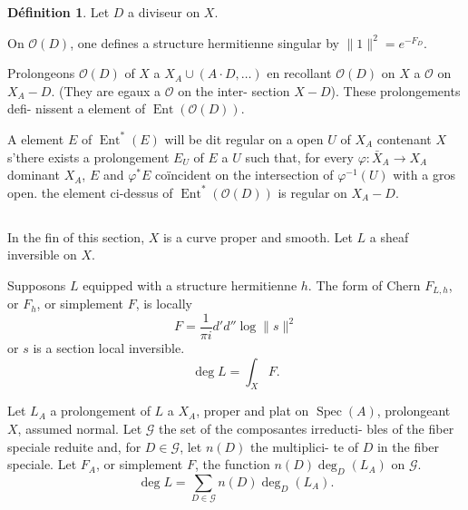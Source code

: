 \documentclass[12pt,a4paper]{article}
\theoremstyle{plain}
\theoremstyle{definition}
\newtheorem{definition}[theorem]{D\'efinition}
\DeclareMathOperator{\Spec}{Spec}
\DeclareMathOperator{\Ent}{Ent}
\newcommand{\Oo}{\mathscr{O}}
\begin{document}
\begin{definition}
Let $D$ a diviseur on $X$.
\end{definition}

\smallskip

\begin{minipage}[t]{0.48\textwidth}
On $\Oo(D)$, one defines a
structure hermitienne
singular by $\|1\|^2 = e^{-F_D}$.
\end{minipage}
\hfill
\begin{minipage}[t]{0.48\textwidth}
Prolongeons $\Oo(D)$ of $X$ a $X_A \cup (A \cdot D, \ldots)$
en recollant $\Oo(D)$ on $X$ a $\Oo$ on
$X_A - D$. (They are egaux a $\Oo$ on the inter-
section $X - D$). These prolongements defi-
nissent a element of $\Ent(\Oo(D))$.
\end{minipage}

\smallskip

A element $E$ of $\Ent^*(E)$ will be dit regular on a open $U$ of $X_A$ contenant
$X$ s'there exists a prolongement $E_U$ of $E$ a $U$ such that, for every $\varphi: \bar{X}_A \to
X_A$ dominant $X_A$, $E$ and $\varphi^*E$ co\"incident on the intersection of $\varphi^{-1}(U)$ with a gros
open. the element ci-dessus of $\Ent^*(\Oo(D))$ is regular on $X_A - D$.

\subsection{}

In the fin of this section, $X$ is a curve proper and smooth. Let $L$ a
sheaf inversible on $X$.

\smallskip

\begin{minipage}[t]{0.48\textwidth}
Supposons $L$ equipped with a structure
hermitienne $h$. The form of Chern
$F_{L,h}$, or $F_h$, or simplement $F$, is
locally
\[
F = \frac{1}{\pi i} d'd'' \log \|s\|^2
\]
or $s$ is a section local
inversible.
\[
\deg L = \int_X F .
\]
\end{minipage}
\hfill
\begin{minipage}[t]{0.48\textwidth}
Let $L_A$ a prolongement of $L$ a
$X_A$, proper and plat on $\Spec(A)$,
prolongeant $X$, assumed normal. Let
$\mathcal{G}$ the set of the composantes irreducti-
bles of the fiber speciale reduite and,
for $D \in \mathcal{G}$, let $n(D)$ the multiplici-
te of $D$ in the fiber speciale. Let
$F_A$, or simplement $F$, the function
$n(D) \deg_D(L_A)$ on $\mathcal{G}$.
\[
\deg L = \sum_{D \in \mathcal{G}} n(D) \deg_D(L_A) .
\]
\end{minipage}
\end{document}

